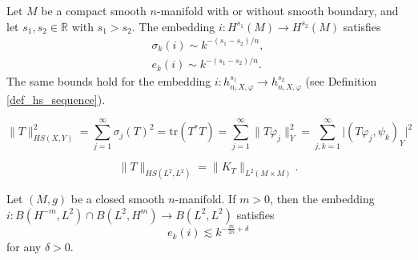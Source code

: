 \documentclass[10pt,a4paper]{amsart}
\newcommand{\abs}[1]{\lvert #1 \rvert}          %
\newcommand{\mR}{\mathbb{R}}                    %
\newcommand{\norm}[1]{\lVert #1 \rVert}         %
\begin{document}
\begin{theorem} \label{thm_sobolev_inclusion}
Let $M$ be a compact smooth $n$-manifold with or without smooth boundary, and let $s_1, s_2 \in \mR$ with $s_1 > s_2$. The embedding $i: H^{s_1}(M) \to H^{s_2}(M)$ satisfies 
\begin{gather*}
\sigma_k(i) \sim k^{-(s_1-s_2)/n}, \\
e_k(i) \sim k^{-(s_1-s_2)/n}.
\end{gather*}
The same bounds hold for the embedding $i: h^{s_1}_{n,X,\varphi} \to h^{s_2}_{n,X,\varphi}$ (see Definition \ref{def_hs_sequence}).
\end{theorem}

\begin{equation} \label{hsxy_equivalent_norms}
\norm{T}_{HS(X,Y)}^2 = \sum_{j=1}^{\infty} \sigma_j(T)^2 = \mathrm{tr}(T^* T) = \sum_{j=1}^{\infty} \norm{T\varphi_j}_Y^2 = \sum_{j,k=1}^{\infty} \abs{(T\varphi_j, \psi_k)_Y}^2
\end{equation}

\begin{equation} \label{hs_ltwo_kernel}
\norm{T}_{HS(L^2, L^2)} = \norm{K_T}_{L^2(M \times M)}.
\end{equation}

\begin{theorem} \label{thm_entropy_bounded_operators_initial}
  Let $(M,g)$ be a closed smooth $n$-manifold. If $m>0$, then the embedding
$ i: B(H^{-m}, L^2) \cap B(L^2, H^m) \to B(L^2,L^2)$ satisfies
\begin{equation} \label{b_initial_entropy_bound}
e_k(i) \lesssim k^{-\frac{m}{2n}+ \delta}
\end{equation}
for any $\delta > 0$.
\end{theorem}
\end{document}
